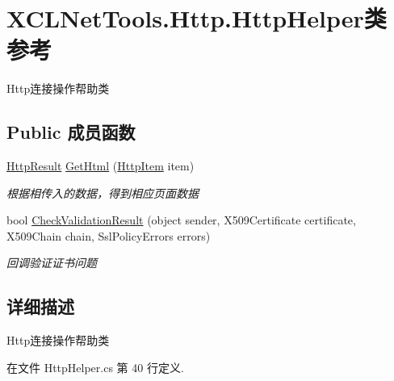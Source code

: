 \hypertarget{class_x_c_l_net_tools_1_1_http_1_1_http_helper}{\section{X\-C\-L\-Net\-Tools.\-Http.\-Http\-Helper类 参考}
\label{class_x_c_l_net_tools_1_1_http_1_1_http_helper}
}


Http连接操作帮助类  


\subsection*{Public 成员函数}
\begin{DoxyCompactItemize}
\item 
\hyperlink{class_x_c_l_net_tools_1_1_entity_1_1_http_1_1_http_result}{Http\-Result} \hyperlink{class_x_c_l_net_tools_1_1_http_1_1_http_helper_a1115d0f405e29654961ad3bcd5272bdf}{Get\-Html} (\hyperlink{class_x_c_l_net_tools_1_1_entity_1_1_http_1_1_http_item}{Http\-Item} item)
\begin{DoxyCompactList}\small\item\em 根据相传入的数据，得到相应页面数据 \end{DoxyCompactList}\item 
bool \hyperlink{class_x_c_l_net_tools_1_1_http_1_1_http_helper_aed104c08e4f4e44e2f3b7529e85c2848}{Check\-Validation\-Result} (object sender, X509\-Certificate certificate, X509\-Chain chain, Ssl\-Policy\-Errors errors)
\begin{DoxyCompactList}\small\item\em 回调验证证书问题 \end{DoxyCompactList}\end{DoxyCompactItemize}


\subsection{详细描述}
Http连接操作帮助类 



在文件 Http\-Helper.\-cs 第 40 行定义.



